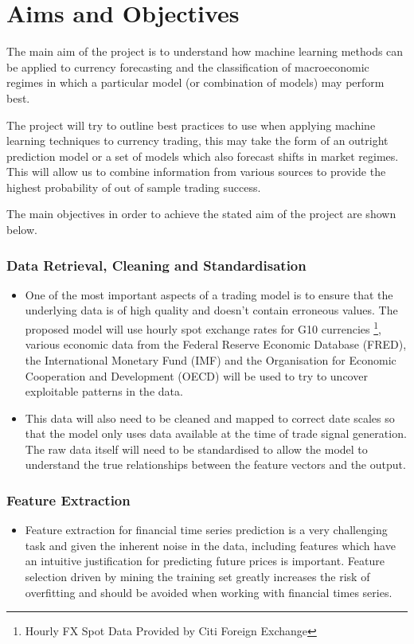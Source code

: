\documentclass[11pt]{article}
\begin{document}
\section{Aims and Objectives}
The main aim of the project is to understand how machine learning methods can be applied to currency forecasting and the classification of macroeconomic regimes in which a particular model (or combination of models) may perform best.
\par The project will try to outline best practices to use when applying machine learning techniques to currency trading, this may take the form of an outright prediction model or a set of models which also forecast shifts in market regimes. This will allow us to combine information from various sources to provide the highest probability of out of sample trading success.

The main objectives in order to achieve the stated aim of the project are shown below.

\subsubsection{Data Retrieval, Cleaning and Standardisation}
\begin{itemize}
\item One of the most important aspects of a trading model is to ensure that the underlying data is of high quality and doesn't contain erroneous values. The proposed model will use hourly spot exchange rates for G10 currencies \footnote{Hourly FX Spot Data Provided by Citi Foreign Exchange}, various economic data from the Federal Reserve Economic Database (FRED), the International Monetary Fund (IMF) and the Organisation for Economic Cooperation and Development (OECD) will be used to try to uncover exploitable patterns in the data. 
\item This data will also need to be cleaned and mapped to correct date scales so that the model only uses data available at the time of trade signal generation. The raw data itself will need to be standardised to allow the model to understand the true relationships between the feature vectors and the output.
\end{itemize}
 \subsubsection{Feature Extraction}
	\begin{itemize}
	\item Feature extraction for financial time series prediction is a very challenging task and given the inherent noise in the data, including features which have an intuitive justification for predicting future prices is important\cite{Arnott2018}. Feature selection driven by mining the training set greatly increases the risk of overfitting and should be avoided when working with financial times series. 
	\end{itemize}
\end{document}

